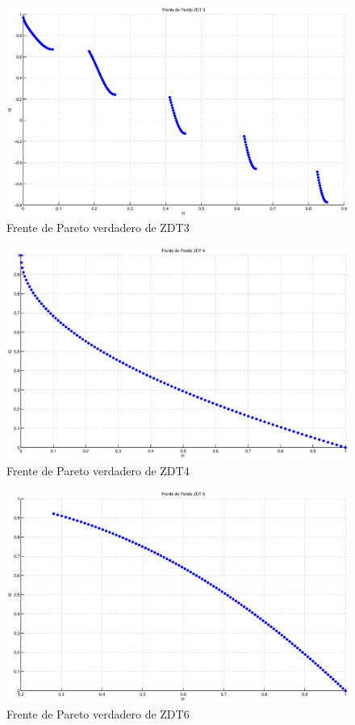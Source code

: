 \begin{figure}
\centering
    \centering
    \includegraphics[scale=0.4]{ApendiceA/paretoZDT3.eps}
    \caption{Frente de Pareto verdadero de ZDT3}
    \label{fig:zdt3}
\end{figure}

\begin{figure}
\centering
    \centering
    \includegraphics[scale=0.4]{ApendiceA/paretoZDT4.eps}
    \caption{Frente de Pareto verdadero de ZDT4}
    \label{fig:zdt4}
\end{figure}
\begin{figure}
\centering
    \centering
    \includegraphics[scale=0.4]{ApendiceA/paretoZDT6.eps}
    \caption{Frente de Pareto verdadero de ZDT6}
    \label{fig:zdt6}

\end{figure}

